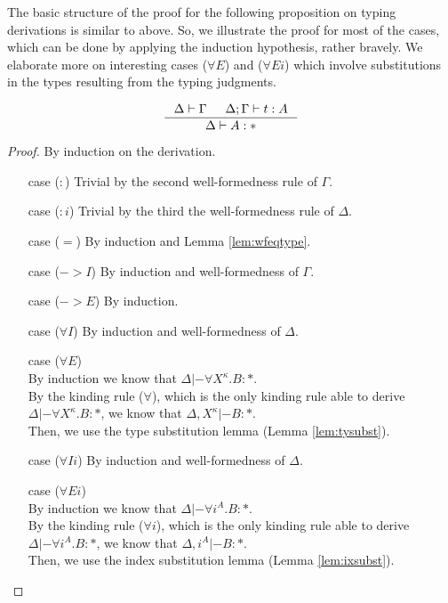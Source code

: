 The basic structure of the proof for the following proposition on typing
derivations is similar to above. So, we illustrate the proof for most of
the cases, which can be done by applying the induction hypothesis, rather
bravely. We elaborate more on interesting cases ($\forall E$) and ($\forall Ei$)
which involve substitutions in the types resulting from the typing judgments.
\begin{proposition}
\label{prop:wftype}
\[ \inference{ \Delta |- \Gamma & \Delta;\Gamma |- t : A}{ \Delta |- A : * }
\]
\end{proposition}
\begin{proof} By induction on the derivation.
\begin{itemize}
\item[case] ($:$)
	Trivial by the second well-formedness rule of $\Gamma$.
\item[case] ($:i$)
	Trivial by the third the well-formedness rule of $\Delta$.
\item[case] ($=$)
	By induction and Lemma \ref{lem:wfeqtype}.
\item[case] ($->$$I$)
	By induction and well-formedness of $\Gamma$.
\item[case] ($->$$E$)
	By induction.
\item[case] ($\forall I$)
	By induction and well-formedness of $\Delta$.
\item[case] ($\forall E$)\\
	By induction we know that $\Delta |- \forall X^\kappa.B : *$.\\
	By the kinding rule ($\forall$), which is the only kinding rule
	able to derive $\Delta |- \forall X^\kappa.B : *$, we know
	that $\Delta,X^\kappa |- B : *$.\\
	Then, we use the type substitution lemma (Lemma \ref{lem:tysubst}).
\item[case] ($\forall Ii$)
	By induction and well-formedness of $\Delta$.
\item[case] ($\forall Ei$)\\
	By induction we know that $\Delta |- \forall i^A.B : *$.\\
	By the kinding rule ($\forall i$), which is the only kinding rule
	able to derive $\Delta |- \forall i^A.B : *$, we know
	that $\Delta,i^A |- B : *$.\\
	Then, we use the index substitution lemma (Lemma \ref{lem:ixsubst}).
\end{itemize}\vspace*{-10pt}
\end{proof}

